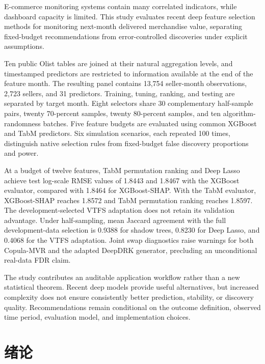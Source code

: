 \documentclass{sufethesismas}
\begin{document}
\begin{abstractEN}E-commerce monitoring systems contain many correlated indicators, while dashboard capacity is limited. This study evaluates recent deep feature selection methods for monitoring next-month delivered merchandise value, separating fixed-budget recommendations from error-controlled discoveries under explicit assumptions.

Ten public Olist tables are joined at their natural aggregation levels, and timestamped predictors are restricted to information available at the end of the feature month. The resulting panel contains 13,754 seller-month observations, 2,723 sellers, and 31 predictors. Training, tuning, ranking, and testing are separated by target month. Eight selectors share 30 complementary half-sample pairs, twenty 70-percent samples, twenty 80-percent samples, and ten algorithm-randomness batches. Five feature budgets are evaluated using common XGBoost and TabM predictors. Six simulation scenarios, each repeated 100 times, distinguish native selection rules from fixed-budget false discovery proportions and power.

At a budget of twelve features, TabM permutation ranking and Deep Lasso achieve test log-scale RMSE values of 1.8443 and 1.8467 with the XGBoost evaluator, compared with 1.8464 for XGBoost-SHAP. With the TabM evaluator, XGBoost-SHAP reaches 1.8572 and TabM permutation ranking reaches 1.8597. The development-selected VTFS adaptation does not retain its validation advantage. Under half-sampling, mean Jaccard agreement with the full development-data selection is 0.9388 for shadow trees, 0.8230 for Deep Lasso, and 0.4068 for the VTFS adaptation. Joint swap diagnostics raise warnings for both Copula-MVR and the adapted DeepDRK generator, precluding an unconditional real-data FDR claim.

The study contributes an auditable application workflow rather than a new statistical theorem. Recent deep models provide useful alternatives, but increased complexity does not ensure consistently better prediction, stability, or discovery quality. Recommendations remain conditional on the outcome definition, observed time period, evaluation model, and implementation choices.
\end{abstractEN}
\tableofcontents
\mainmatter
\chapter{绪论}
\end{document}
